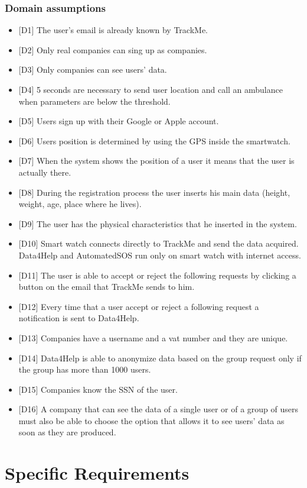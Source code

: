 \documentclass{article}
\begin{document}
\subsubsection{Domain assumptions}
\begin{itemize}
	\item {[D1]} The user's email is already known by TrackMe.
	\item {[D2]} Only real companies can sing up as companies.
	\item {[D3]} Only companies can see users' data.
	\item {[D4]} 5 seconds are necessary to send user location and call an ambulance when parameters are below the threshold.
	\item {[D5]} Users sign up with their Google or Apple account.
	\item {[D6]} Users position is determined by using the GPS inside the smartwatch.
	\item {[D7]} When the system shows the position of a user it means that the user is
actually there.
	\item {[D8]} During the registration process the user inserts his main data (height, weight, age, place where he lives).
	\item {[D9]} The user has the physical characteristics that he inserted in the system.
	\item {[D10]} Smart watch connects directly to TrackMe and send the data acquired. Data4Help and AutomatedSOS run only on smart watch with internet access.
	\item {[D11]} The user is able to accept or reject the following requests by clicking a button on the email that TrackMe sends to him.
	\item {[D12]} Every time that a user accept or reject a following request a notification is sent to Data4Help.
	\item {[D13]} Companies have a username and a vat number and they are unique.
	\item {[D14]} Data4Help is able to anonymize data based on the group request only if the group has more than 1000 users.
	\item {[D15]} Companies know the SSN of the user. 
	\item {[D16]} A company that can see the data of a single user or of a group of users must also be able to choose the option that allows it to see users' data as soon as they are produced.
\end{itemize}
\section{Specific Requirements}
\end{document}
